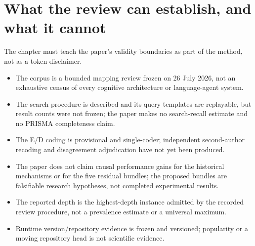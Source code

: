 \section{What the review can establish, and what it cannot}
The chapter must teach the paper's validity boundaries as part of the method, not as a token disclaimer.
\begin{itemize}
  \item The corpus is a bounded mapping review frozen on 26 July 2026, not an exhaustive census of every cognitive architecture or language-agent system.
  \item The search procedure is described and its query templates are replayable, but result counts were not frozen; the paper makes no search-recall estimate and no PRISMA completeness claim.
  \item The E/D coding is provisional and single-coder; independent second-author recoding and disagreement adjudication have not yet been produced.
  \item The paper does not claim causal performance gains for the historical mechanisms or for the five residual bundles; the proposed bundles are falsifiable research hypotheses, not completed experimental results.
  \item The reported depth is the highest-depth instance admitted by the recorded review procedure, not a prevalence estimate or a universal maximum.
  \item Runtime version/repository evidence is frozen and versioned; popularity or a moving repository head is not scientific evidence.
\end{itemize}

